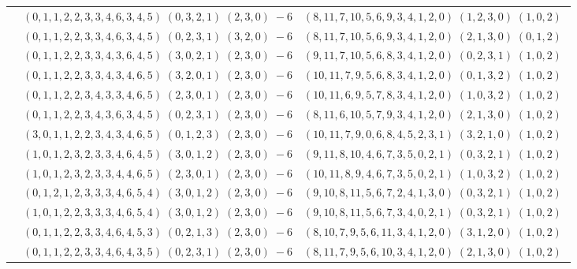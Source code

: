 \documentclass[11pt]{article}
\begin{document}
\begin{longtable}[l]{|c|c|c|}
 \cline{2-3} 
 & $(0 ,1 ,1 ,2 ,2 ,3 ,3 ,4 ,6 ,3 ,4 ,5) \;(0 ,3 ,2 ,1) \;(2 ,3 ,0) \;-6$ & $(8 ,11 ,7 ,10 ,5 ,6 ,9 ,3 ,4 ,1 ,2 ,0) \;(1 ,2 ,3 ,0) \;(1 ,0 ,2) \;$\\ 
 \cline{2-3} 
 & $(0 ,1 ,1 ,2 ,2 ,3 ,3 ,4 ,6 ,3 ,4 ,5) \;(0 ,2 ,3 ,1) \;(3 ,2 ,0) \;-6$ & $(8 ,11 ,7 ,10 ,5 ,6 ,9 ,3 ,4 ,1 ,2 ,0) \;(2 ,1 ,3 ,0) \;(0 ,1 ,2) \;$\\ 
 \cline{2-3} 
 & $(0 ,1 ,1 ,2 ,2 ,3 ,3 ,4 ,3 ,6 ,4 ,5) \;(3 ,0 ,2 ,1) \;(2 ,3 ,0) \;-6$ & $(9 ,11 ,7 ,10 ,5 ,6 ,8 ,3 ,4 ,1 ,2 ,0) \;(0 ,2 ,3 ,1) \;(1 ,0 ,2) \;$\\ 
 \cline{2-3} 
 & $(0 ,1 ,1 ,2 ,2 ,3 ,3 ,4 ,3 ,4 ,6 ,5) \;(3 ,2 ,0 ,1) \;(2 ,3 ,0) \;-6$ & $(10 ,11 ,7 ,9 ,5 ,6 ,8 ,3 ,4 ,1 ,2 ,0) \;(0 ,1 ,3 ,2) \;(1 ,0 ,2) \;$\\ 
 \cline{2-3} 
 & $(0 ,1 ,1 ,2 ,2 ,3 ,4 ,3 ,3 ,4 ,6 ,5) \;(2 ,3 ,0 ,1) \;(2 ,3 ,0) \;-6$ & $(10 ,11 ,6 ,9 ,5 ,7 ,8 ,3 ,4 ,1 ,2 ,0) \;(1 ,0 ,3 ,2) \;(1 ,0 ,2) \;$\\ 
 \cline{2-3} 
 & $(0 ,1 ,1 ,2 ,2 ,3 ,4 ,3 ,6 ,3 ,4 ,5) \;(0 ,2 ,3 ,1) \;(2 ,3 ,0) \;-6$ & $(8 ,11 ,6 ,10 ,5 ,7 ,9 ,3 ,4 ,1 ,2 ,0) \;(2 ,1 ,3 ,0) \;(1 ,0 ,2) \;$\\ 
 \cline{2-3} 
 & $(3 ,0 ,1 ,1 ,2 ,2 ,3 ,4 ,3 ,4 ,6 ,5) \;(0 ,1 ,2 ,3) \;(2 ,3 ,0) \;-6$ & $(10 ,11 ,7 ,9 ,0 ,6 ,8 ,4 ,5 ,2 ,3 ,1) \;(3 ,2 ,1 ,0) \;(1 ,0 ,2) \;$\\ 
 \cline{2-3} 
 & $(1 ,0 ,1 ,2 ,3 ,2 ,3 ,3 ,4 ,6 ,4 ,5) \;(3 ,0 ,1 ,2) \;(2 ,3 ,0) \;-6$ & $(9 ,11 ,8 ,10 ,4 ,6 ,7 ,3 ,5 ,0 ,2 ,1) \;(0 ,3 ,2 ,1) \;(1 ,0 ,2) \;$\\ 
 \cline{2-3} 
 & $(1 ,0 ,1 ,2 ,3 ,2 ,3 ,3 ,4 ,4 ,6 ,5) \;(2 ,3 ,0 ,1) \;(2 ,3 ,0) \;-6$ & $(10 ,11 ,8 ,9 ,4 ,6 ,7 ,3 ,5 ,0 ,2 ,1) \;(1 ,0 ,3 ,2) \;(1 ,0 ,2) \;$\\ 
 \cline{2-3} 
 & $(0 ,1 ,2 ,1 ,2 ,3 ,3 ,3 ,4 ,6 ,5 ,4) \;(3 ,0 ,1 ,2) \;(2 ,3 ,0) \;-6$ & $(9 ,10 ,8 ,11 ,5 ,6 ,7 ,2 ,4 ,1 ,3 ,0) \;(0 ,3 ,2 ,1) \;(1 ,0 ,2) \;$\\ 
 \cline{2-3} 
 & $(1 ,0 ,1 ,2 ,2 ,3 ,3 ,3 ,4 ,6 ,5 ,4) \;(3 ,0 ,1 ,2) \;(2 ,3 ,0) \;-6$ & $(9 ,10 ,8 ,11 ,5 ,6 ,7 ,3 ,4 ,0 ,2 ,1) \;(0 ,3 ,2 ,1) \;(1 ,0 ,2) \;$\\ 
 \cline{2-3} 
 & $(0 ,1 ,1 ,2 ,2 ,3 ,3 ,4 ,6 ,4 ,5 ,3) \;(0 ,2 ,1 ,3) \;(2 ,3 ,0) \;-6$ & $(8 ,10 ,7 ,9 ,5 ,6 ,11 ,3 ,4 ,1 ,2 ,0) \;(3 ,1 ,2 ,0) \;(1 ,0 ,2) \;$\\ 
 \cline{2-3} 
 & $(0 ,1 ,1 ,2 ,2 ,3 ,3 ,4 ,6 ,4 ,3 ,5) \;(0 ,2 ,3 ,1) \;(2 ,3 ,0) \;-6$ & $(8 ,11 ,7 ,9 ,5 ,6 ,10 ,3 ,4 ,1 ,2 ,0) \;(2 ,1 ,3 ,0) \;(1 ,0 ,2) \;$\\ 

\end{longtable}
\end{document}
